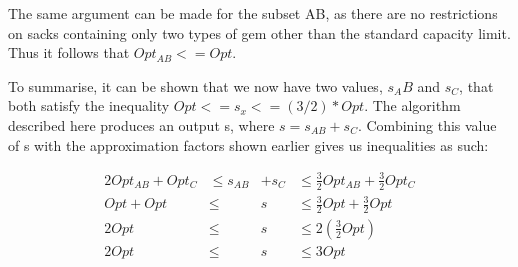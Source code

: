 \documentclass[paper=a4, fontsize=12pt]{article}
\begin{document}
The same argument can be made for the subset AB, as there are no restrictions
on sacks containing only two types of gem other than the standard capacity
limit. Thus it follows that \(Opt_{AB} <= Opt\).

To summarise, it can be shown that we now have two values, \(s_AB\) and
\(s_C\), that both satisfy the inequality \(Opt <= s_x <= (3/2) * Opt\). The
algorithm described here produces an output s, where \(s = s_{AB} +
s_C\). Combining this value of s with the approximation factors shown earlier
gives us inequalities as such:

\begin{alignat*}{2}
Opt_{AB} + Opt_C &\leq s_{AB} &+ s_C &\leq \frac{3}{2} Opt_{AB} + \frac{3}{2} Opt_C\\
Opt + Opt &\leq &s \quad &\leq \frac{3}{2} Opt + \frac{3}{2} Opt\\
2 Opt &\leq &s \quad &\leq 2 (\frac{3}{2} Opt)\\
2 Opt &\leq &s \quad &\leq{} 3 Opt
\end{alignat*}
\end{document}
